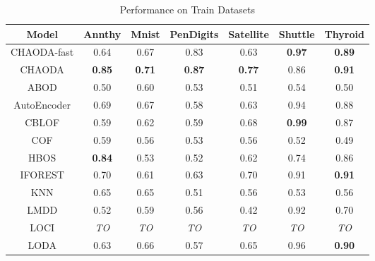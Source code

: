 \begin{table}[!t]
\renewcommand{\arraystretch}{1.25}
\caption{Performance on Train Datasets}
\label{supplement:table:results:train-performance}
\vskip 0.15in
\begin{center}
\begin{small}
\begin{tabular}{|c|c|c|c|c|c|c|}
\hline
\textbf{Model} & \textbf{Annthy} & \textbf{Mnist} & \textbf{PenDigits} & \textbf{Satellite} & \textbf{Shuttle} & \textbf{Thyroid} \\
\hline
CHAODA-fast    & 0.64            & 0.67           & 0.83               & 0.63               & \textbf{0.97}    & \textbf{0.89}    \\
\hline
CHAODA         & \textbf{0.85}   & \textbf{0.71}  & \textbf{0.87}      & \textbf{0.77}      & 0.86             & \textbf{0.91}     \\
\hline
ABOD &                0.50 &           0.60 &               0.53 &               0.51 &             0.54 &             0.50 \\
\hline
AutoEncoder &                0.69 &           0.67 &               0.58 &               0.63 &             0.94 &             0.88 \\
\hline
CBLOF &                0.59 &           0.62 &               0.59 &               0.68 &    \textbf{0.99} &             0.87 \\
\hline
COF &                0.59 &           0.56 &               0.53 &               0.56 &             0.52 &             0.49 \\
\hline
HBOS &       \textbf{0.84} &           0.53 &               0.52 &               0.62 &             0.74 &             0.86 \\
\hline
IFOREST &                0.70 &           0.61 &               0.63 &               0.70 &             0.91 &    \textbf{0.91} \\
\hline
KNN &                0.65 &           0.65 &               0.51 &               0.56 &             0.53 &             0.56 \\
\hline
LMDD &                0.52 &           0.59 &               0.56 &               0.42 &             0.92 &             0.70 \\
\hline
LOCI &         \textit{TO} &    \textit{TO} &        \textit{TO} &        \textit{TO} &      \textit{TO} &      \textit{TO} \\
\hline
LODA &                0.63 &           0.66 &               0.57 &               0.65 &             0.96 &    \textbf{0.90} \\

\end{tabular}
\end{small}
\end{center}
\end{table}
